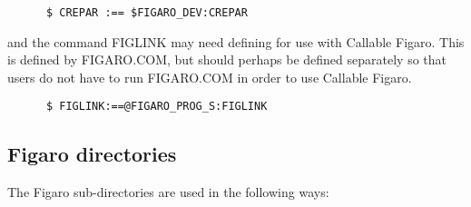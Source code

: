 \begin{verbatim}
      $ CREPAR :== $FIGARO_DEV:CREPAR
\end{verbatim}
    
and the command FIGLINK may need defining for use with Callable Figaro. This is
defined by FIGARO.COM, but should perhaps be defined separately so that users
do not have to run FIGARO.COM in order to use Callable Figaro.

\begin{verbatim}
      $ FIGLINK:==@FIGARO_PROG_S:FIGLINK
\end{verbatim}

\subsection{Figaro directories}

The Figaro sub-directories are used in the following ways:

